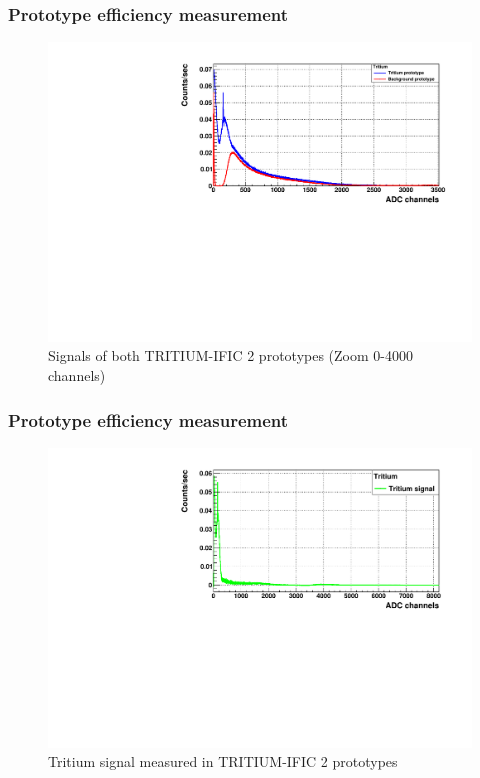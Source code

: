 \documentclass{beamer}
\begin{document}
\begin{frame}
\frametitle{Prototype efficiency measurement}

\begin{figure}[hbtp]
\centering
\includegraphics[scale=0.6]{Imagenes/2Efficiency/Signal_background_real_time_ZOOM.pdf}
\caption{Signals of both TRITIUM-IFIC 2 prototypes (Zoom 0-4000 channels)}
\end{figure}


\end{frame}

\begin{frame}
\frametitle{Prototype efficiency measurement}

\begin{figure}[hbtp]
\centering
\includegraphics[scale=0.6]{Imagenes/2Efficiency/Net_tritium_signal_real_time.pdf}
\caption{Tritium signal measured in TRITIUM-IFIC 2 prototypes}
\end{figure}


\end{frame}
\end{document}
